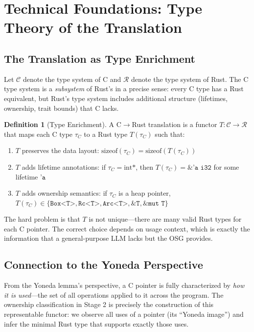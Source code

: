 \documentclass[11pt,a4paper]{article}
\theoremstyle{definition}
\newtheorem{definition}{Definition}[section]
\theoremstyle{remark}
\begin{document}
\section{Technical Foundations: Type Theory of the Translation}

\subsection{The Translation as Type Enrichment}

Let $\mathcal{C}$ denote the type system of C and $\mathcal{R}$ denote the type system of Rust. The C type system is a \textit{subsystem} of Rust's in a precise sense: every C type has a Rust equivalent, but Rust's type system includes additional structure (lifetimes, ownership, trait bounds) that C lacks.

\begin{definition}[Type Enrichment]
A C$\to$Rust translation is a functor $T: \mathcal{C} \to \mathcal{R}$ that maps each C type $\tau_C$ to a Rust type $T(\tau_C)$ such that:
\begin{enumerate}
\item $T$ preserves the data layout: $\text{sizeof}(\tau_C) = \text{sizeof}(T(\tau_C))$
\item $T$ adds lifetime annotations: if $\tau_C = \text{int*}$, then $T(\tau_C) = \texttt{\&'a i32}$ for some lifetime $\texttt{'a}$
\item $T$ adds ownership semantics: if $\tau_C$ is a heap pointer, $T(\tau_C) \in \{\texttt{Box<T>}, \texttt{Rc<T>}, \texttt{Arc<T>}, \texttt{\&T}, \texttt{\&mut T}\}$
\end{enumerate}
\end{definition}

The hard problem is that $T$ is not unique---there are many valid Rust types for each C pointer. The correct choice depends on usage context, which is exactly the information that a general-purpose LLM lacks but the OSG provides.

\subsection{Connection to the Yoneda Perspective}

From the Yoneda lemma's perspective, a C pointer is fully characterized by \textit{how it is used}---the set of all operations applied to it across the program. The ownership classification in Stage 2 is precisely the construction of this representable functor: we observe all uses of a pointer (its ``Yoneda image'') and infer the minimal Rust type that supports exactly those uses.
\end{document}
